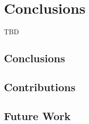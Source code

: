 \chapter{Conclusions}
\label{chap:conc}
TBD
\section{Conclusions}


\section{Contributions}

\section{Future Work}

